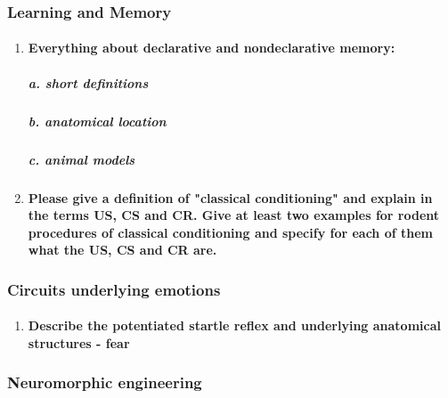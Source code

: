 \documentclass[12pt,article,oneside,a4paper]{memoir}
\begin{document}
\subsubsection{Learning and Memory}

\begin{enumerate}
\item \paragraph{Everything about declarative and nondeclarative memory:}
\subparagraph{a. short definitions}
\subparagraph{b. anatomical location}
\subparagraph{c. animal models}

\item \paragraph{Please give a definition of "classical conditioning" and explain in the terms US, CS and CR. Give at least two examples for rodent procedures of classical conditioning and specify for each of them what the US, CS and CR are.}

\end{enumerate}

\subsubsection{Circuits underlying emotions}

\begin{enumerate}
\item \paragraph{Describe the potentiated startle reflex and underlying anatomical structures - fear}
\end{enumerate}

\subsubsection{Neuromorphic engineering}
\end{document}
